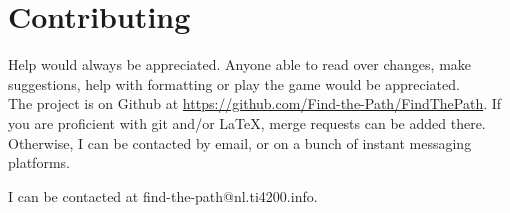 \chapter*{Contributing}

Help would always be appreciated. Anyone able to read over changes, make suggestions, help
with formatting or play the game would be appreciated. \\

The project is on Github at \url{https://github.com/Find-the-Path/FindThePath}. If you are
proficient with git and/or \LaTeX, merge requests can be added there. Otherwise, I can be
contacted by email, or on a bunch of instant messaging platforms.

I can be contacted at find-the-path@nl.ti4200.info.